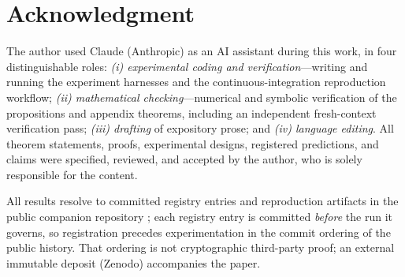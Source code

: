\documentclass[lettersize,onecolumn]{IEEEtran}
\theoremstyle{definition}
\theoremstyle{remark}
\begin{document}
\section*{Acknowledgment}
The author used Claude (Anthropic) as an AI assistant during this work, in four
distinguishable roles: \emph{(i) experimental coding and verification}---writing and
running the experiment harnesses and the continuous-integration reproduction workflow;
\emph{(ii) mathematical checking}---numerical and symbolic verification of the
propositions and appendix theorems, including an independent fresh-context
verification pass; \emph{(iii) drafting} of expository prose; and \emph{(iv) language
editing}. All theorem statements, proofs, experimental designs, registered
predictions, and claims were specified, reviewed, and accepted by the author, who is
solely responsible for the content.

All results resolve to committed registry entries and reproduction artifacts in the
public companion repository \cite{ledger2026}; each registry entry is committed
\emph{before} the run it governs, so registration precedes experimentation in the
commit ordering of the public history. That ordering is not cryptographic third-party
proof; an external immutable deposit (Zenodo) accompanies the paper.
\end{document}

